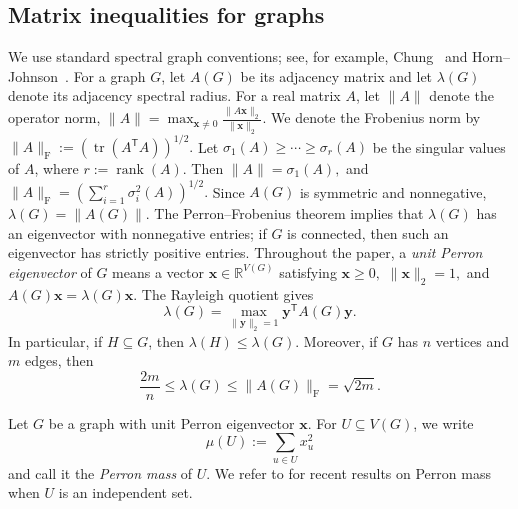 \documentclass[11pt]{article}
\theoremstyle{definition}
\theoremstyle{plain}
\begin{document}
\subsection{Matrix inequalities for graphs}
\label{subsec:prelim-spectral}

We use standard spectral graph conventions; see, for example,
Chung~\cite{Chung1997SpectralGraphTheory} and
Horn--Johnson~\cite{HornJohnson2012MatrixAnalysis}.  For a graph \(G\),
let \(A(G)\) be its adjacency matrix and let \(\lambda(G)\) denote its
adjacency spectral radius.  For a real matrix \(A\), let \(\|A\|\) denote
the operator norm, $\|A\|
        =
        \max_{\bm{x}\neq 0}
        \frac{\|A\bm{x}\|_2}{\|\bm{x}\|_2}.$
We denote the Frobenius norm by $\|A\|_{\mathrm F}
        :=
    (\operatorname{tr}(A^{\mathsf T}A) )^{1/2}.$
Let $\sigma_1(A)\ge \cdots \ge \sigma_r(A)$
be the singular values of \(A\), where \(r:=\operatorname{rank}(A)\).
Then $\|A\|=\sigma_1(A),$ and $
        \|A\|_{\mathrm F}
=(\sum_{i=1}^r\sigma_i^2(A))^{1/2}.$
Since \(A(G)\) is symmetric and nonnegative, \(\lambda(G)=\|A(G)\|\).
The Perron--Frobenius theorem implies that \(\lambda(G)\) has an
eigenvector with nonnegative entries; if \(G\) is connected, then such an
eigenvector has strictly positive entries.  Throughout the paper, a
\emph{unit Perron eigenvector} of \(G\) means a vector
\(\bm{x}\in\mathbb R^{V(G)}\) satisfying
$\bm{x}\ge 0,$ $
        \|\bm{x}\|_2=1,$ and $
        A(G)\bm{x}=\lambda(G)\bm{x}.$ The Rayleigh quotient gives
\[
        \lambda(G)
        =
        \max_{\|\bm{y}\|_2=1}
        \bm{y}^{\mathsf T}A(G)\bm{y}.
\]
In particular, if \(H\subseteq G\), then \(\lambda(H)\le \lambda(G)\).
Moreover, if \(G\) has \(n\) vertices and \(m\) edges, then
\[
        \frac{2m}{n}\le \lambda(G)\le \|A(G)\|_{\mathrm F}=\sqrt{2m}.
\]

Let \(G\) be a graph with unit Perron eigenvector \(\bm{x}\).  For
\(U\subseteq V(G)\), we write
\[
        \mu(U):=\sum_{u\in U}x_u^2
\]
and call it the \emph{Perron mass} of \(U\).  We refer to
\cite{LiuNing2026, CLLLN2026} for recent results on Perron mass when
\(U\) is an independent set.
\end{document}
